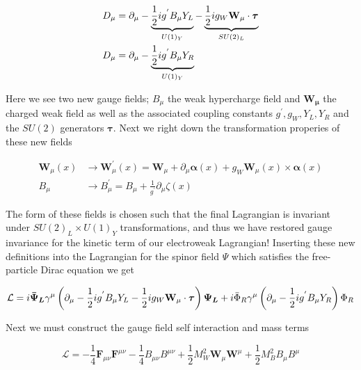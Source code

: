 \begin{align} 
\label{eq:qed:left} 
D_\mu &= \partial_{\mu}
- \underbrace{\frac{1}{2}ig^{'}B_{\mu}Y_{L}}_{U(1)_Y} -
  \underbrace{\frac{1}{2}ig_{W}\bf{W}_\mu \cdot \boldsymbol{\tau}}_{SU(2)_L} \\
\label{eq:qed:right} 
D_\mu &= \partial_{\mu}  - \underbrace{\frac{1}{2}ig^{'}B_{\mu}Y_{R}}_{U(1)_Y} 
\end{align}

Here we see two new gauge fields; $B_\mu$ the weak hypercharge field and
$\boldsymbol{W_\mu}$ the charged weak field as well as the associated coupling
constants $g^{'}, g_{W}, Y_{L}, Y_{R}$ and the $SU(2)$ generators
$\boldsymbol{\tau}$.   Next we right down the transformation properies of these
new fields 

\begin{align}
\boldsymbol{W}_{\mu}(x) &\rightarrow \boldsymbol{W}_{\mu}^{'}(x) =
\boldsymbol{W}_{\mu} + \partial_{\mu} \boldsymbol{\alpha}(x) +
g_{W}\boldsymbol{W}_{\mu}(x) \times \boldsymbol{\alpha}(x)
\\ 
B_{\mu} &\rightarrow B_{\mu}^{'} = B_{\mu} +
\frac{1}{g^{'}}\partial_{\mu}\zeta(x)
\end{align}

The form of these fields is chosen such that the final Lagrangian is invariant
under $SU(2)_L \times U(1)_Y$ transformations, and thus we have restored gauge
invariance for the kinetic term of our electroweak Lagrangian!  Inserting these
new definitions into the Lagrangian for the spinor field $\Psi$ which satisfies
the free-particle Dirac equation we get

\begin{equation} \label{eq:qed:fermion_lagrangian}
\mathcal{L} = i\boldsymbol{\bar{\Psi}_L}\gamma^{\mu} \left( \partial_{\mu}
- \frac{1}{2}ig^{'}B_{\mu}Y_{L} - \frac{1}{2}ig_{W}\bf{W}_\mu \cdot
  \boldsymbol{\tau} \right) \boldsymbol{\Psi_L} + i \bar{\Phi}_{R}\gamma^{\mu}
\left(\partial_{\mu} - \frac{1}{2}ig^{'}B_{\mu}Y_{R} \right) \Phi_{R}
\end{equation}

Next we must construct the gauge field self interaction and mass terms

\begin{equation} \label{eq:qed:gauge_lagrangian}
\mathcal{L} = -\frac{1}{4}\boldsymbol{F}_{\mu\nu}\boldsymbol{F}^{\mu\nu}
-\frac{1}{4}B_{\mu\nu}B^{\mu\nu} +
\frac{1}{2}M_{W}^{2}\boldsymbol{W}_{\mu}\boldsymbol{W}^{\mu} +
\frac{1}{2}M_{B}^{2}B_{\mu}B^{\mu}
\end{equation}

